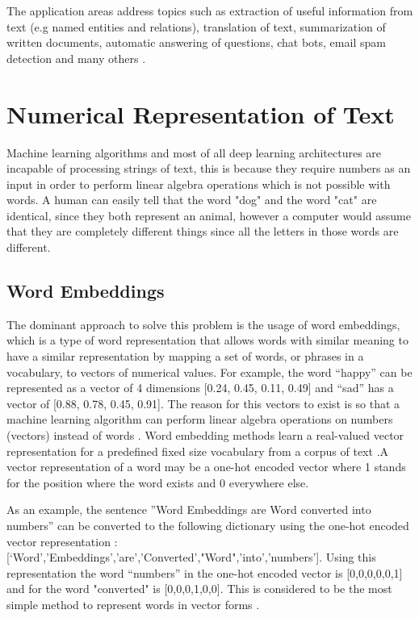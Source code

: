 The application areas address topics such as extraction of useful information from text (e.g named entities and relations), translation of text, summarization of written documents, automatic answering of questions, chat bots, email spam detection and many others \cite{Otter2018}.




\section{Numerical Representation of Text}
\label{sec:num}

\par Machine learning algorithms and most of all deep learning architectures are incapable of processing strings of text, this is because they require numbers as an input in order to perform linear algebra operations\cite{Vidhya2017} which is not possible with words. A human can easily tell that the word "dog" and the word "cat" are identical, since they both represent an animal, however a computer would assume that they are completely different things since all the letters in those  words are different. 

    \subsection{Word Embeddings}

    \par The dominant approach to solve this problem is the usage of word embeddings, which is a type of word representation that allows words with similar meaning to have a similar representation by mapping a set of words, or phrases in a vocabulary, to vectors of numerical values. For example, the word “happy” can be represented as a vector of 4 dimensions [0.24, 0.45, 0.11, 0.49] and “sad” has a vector of [0.88, 0.78, 0.45, 0.91]. The reason for this vectors to exist is so that a machine learning algorithm can perform linear algebra operations on numbers (vectors) instead of words \cite{MuratMustafa}. Word embedding methods learn a real-valued vector representation for a predefined fixed size vocabulary from a corpus  of text \cite{Brownlee2017}.A vector representation of a word may be a one-hot encoded vector where 1 stands for the position where the word exists and 0 everywhere else. 
    
    \par As an example, the sentence ”Word Embeddings are Word converted into numbers” can be converted to the following dictionary using the one-hot encoded vector representation : [‘Word’,’Embeddings’,’are’,’Converted’,"Word",’into’,’numbers’]. Using this representation the word “numbers” in the one-hot encoded vector is [0,0,0,0,0,1] and for the word "converted" is [0,0,0,1,0,0]. This is considered to be the most simple method to represent words in vector forms \cite{Vidhya2017}.

